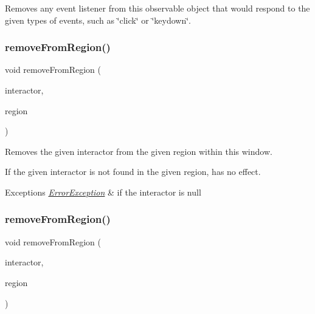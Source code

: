 Removes any event listener from this observable object that would respond to the given types of events, such as \char`\"{}click\char`\"{} or \char`\"{}keydown\char`\"{}. 

\mbox{\label{classGWindow_a87a74b040025878283ba685e30d5104f}} 
\subsubsection{\texorpdfstring{remove\+From\+Region()}{removeFromRegion()}\hspace{0.1cm}{\footnotesize\ttfamily [1/4]}}
{\footnotesize\ttfamily void remove\+From\+Region (\begin{DoxyParamCaption}\item[{\mbox{\hyperlink{classGInteractor}{G\+Interactor}} $\ast$}]{interactor,  }\item[{\mbox{\hyperlink{classGWindow_a81a01a86de31071a92e6cce0bab9bc4b}{Region}}}]{region }\end{DoxyParamCaption})\hspace{0.3cm}{\ttfamily [virtual]}}



Removes the given interactor from the given region within this window. 

If the given interactor is not found in the given region, has no effect. 
\begin{DoxyExceptions}{Exceptions}
{\em \mbox{\hyperlink{classErrorException}{Error\+Exception}}} & if the interactor is null \\
\hline
\end{DoxyExceptions}
\mbox{\label{classGWindow_a16268c8344a5a5d9b10bde95764112d1}} 
\subsubsection{\texorpdfstring{remove\+From\+Region()}{removeFromRegion()}\hspace{0.1cm}{\footnotesize\ttfamily [2/4]}}
{\footnotesize\ttfamily void remove\+From\+Region (\begin{DoxyParamCaption}\item[{\mbox{\hyperlink{classGInteractor}{G\+Interactor}} $\ast$}]{interactor,  }\item[{const std\+::string \&}]{region }\end{DoxyParamCaption})\hspace{0.3cm}{\ttfamily [virtual]}}



